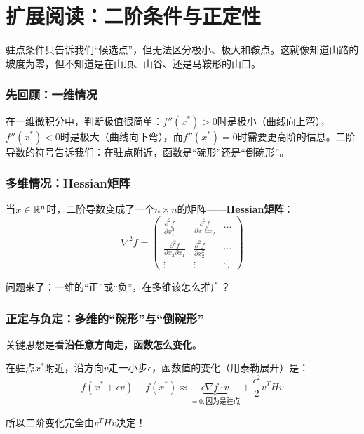 \section*{扩展阅读：二阶条件与正定性}

驻点条件只告诉我们“候选点”，但无法区分极小、极大和鞍点。这就像知道山路的坡度为零，但不知道是在山顶、山谷、还是马鞍形的山口。

\subsubsection{先回顾：一维情况}

在一维微积分中，判断极值很简单：$f''(x^*) > 0$时是极小（曲线向上弯），$f''(x^*) < 0$时是极大（曲线向下弯），而$f''(x^*) = 0$时需要更高阶的信息。二阶导数的符号告诉我们：在驻点附近，函数是“碗形”还是“倒碗形”。

\subsubsection{多维情况：Hessian矩阵}

当$x \in \mathbb{R}^n$时，二阶导数变成了一个$n \times n$的矩阵——\textbf{Hessian矩阵}：
\[
\nabla^2 f = \begin{pmatrix}
\frac{\partial^2 f}{\partial x_1^2} & \frac{\partial^2 f}{\partial x_1 \partial x_2} & \cdots \\
\frac{\partial^2 f}{\partial x_2 \partial x_1} & \frac{\partial^2 f}{\partial x_2^2} & \cdots \\
\vdots & \vdots & \ddots
\end{pmatrix}
\]

问题来了：一维的“正”或“负”，在多维该怎么推广？

\subsubsection{正定与负定：多维的“碗形”与“倒碗形”}

关键思想是看\textbf{沿任意方向走，函数怎么变化}。

在驻点$x^*$附近，沿方向$v$走一小步$\epsilon$，函数值的变化（用泰勒展开）是：
\[
f(x^* + \epsilon v) - f(x^*) \approx \underbrace{\epsilon \nabla f \cdot v}_{=0,\text{因为是驻点}} + \frac{\epsilon^2}{2} v^T H v
\]

所以二阶变化完全由$v^T H v$决定！

\begin{center}
\end{center}

